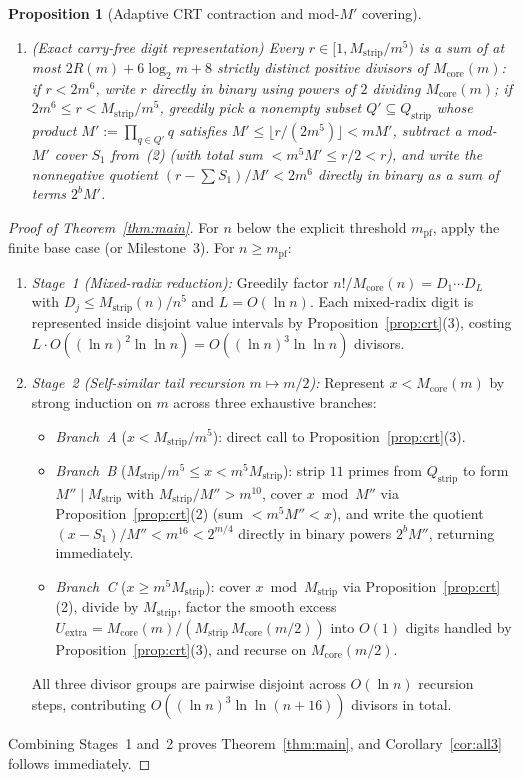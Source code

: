 \documentclass[11pt,a4paper]{amsart}
\newtheorem{proposition}[theorem]{Proposition}
\theoremstyle{definition}
\theoremstyle{remark}
\begin{document}
\begin{proposition}[Adaptive CRT contraction and mod-$M'$ covering]
\begin{enumerate}
  \item \emph{(Exact carry-free digit representation)} Every $r \in [1, M_{\mathrm{strip}}/m^5)$ is a sum of at most $2R(m) + 6\log_2 m + 8$ strictly distinct positive divisors of $M_{\mathrm{core}}(m)$: if $r < 2m^6$, write $r$ directly in binary using powers of $2$ dividing $M_{\mathrm{core}}(m)$; if $2m^6 \le r < M_{\mathrm{strip}}/m^5$, greedily pick a nonempty subset $Q' \subseteq Q_{\mathrm{strip}}$ whose product $M' := \prod_{q \in Q'} q$ satisfies $M' \le \lfloor r/(2m^5) \rfloor < m M'$, subtract a mod-$M'$ cover $S_1$ from~(2) (with total sum $< m^5 M' \le r/2 < r$), and write the nonnegative quotient $(r - \sum S_1)/M' < 2m^6$ directly in binary as a sum of terms $2^b M'$.
\end{enumerate}
\end{proposition}

\begin{proof}[Proof of Theorem~\ref{thm:main}]
For $n$ below the explicit threshold $m_{\mathrm{pf}}$, apply the finite base case (or Milestone~3). For $n \ge m_{\mathrm{pf}}$:
\begin{enumerate}
  \item \emph{Stage~1 (Mixed-radix reduction):} Greedily factor $n!/M_{\mathrm{core}}(n) = D_1 \cdots D_L$ with $D_j \le M_{\mathrm{strip}}(n)/n^5$ and $L = O(\ln n)$. Each mixed-radix digit is represented inside disjoint value intervals by Proposition~\ref{prop:crt}(3), costing $L \cdot O((\ln n)^2 \ln\ln n) = O((\ln n)^3 \ln\ln n)$ divisors.
  \item \emph{Stage~2 (Self-similar tail recursion $m \mapsto m/2$):} Represent $x < M_{\mathrm{core}}(m)$ by strong induction on $m$ across three exhaustive branches:
  \begin{itemize}
    \item \emph{Branch~A} ($x < M_{\mathrm{strip}}/m^5$): direct call to Proposition~\ref{prop:crt}(3).
    \item \emph{Branch~B} ($M_{\mathrm{strip}}/m^5 \le x < m^5 M_{\mathrm{strip}}$): strip $11$ primes from $Q_{\mathrm{strip}}$ to form $M'' \mid M_{\mathrm{strip}}$ with $M_{\mathrm{strip}}/M'' > m^{10}$, cover $x \bmod M''$ via Proposition~\ref{prop:crt}(2) (sum $< m^5 M'' < x$), and write the quotient $(x - S_1)/M'' < m^{16} < 2^{m/4}$ directly in binary powers $2^b M''$, returning immediately.
    \item \emph{Branch~C} ($x \ge m^5 M_{\mathrm{strip}}$): cover $x \bmod M_{\mathrm{strip}}$ via Proposition~\ref{prop:crt}(2), divide by $M_{\mathrm{strip}}$, factor the smooth excess $U_{\mathrm{extra}} = M_{\mathrm{core}}(m)/(M_{\mathrm{strip}}\,M_{\mathrm{core}}(m/2))$ into $O(1)$ digits handled by Proposition~\ref{prop:crt}(3), and recurse on $M_{\mathrm{core}}(m/2)$.
  \end{itemize}
  All three divisor groups are pairwise disjoint across $O(\ln n)$ recursion steps, contributing $O((\ln n)^3 \ln\ln(n+16))$ divisors in total.
\end{enumerate}
Combining Stages~1 and~2 proves Theorem~\ref{thm:main}, and Corollary~\ref{cor:all3} follows immediately.
\end{proof}
\end{document}
